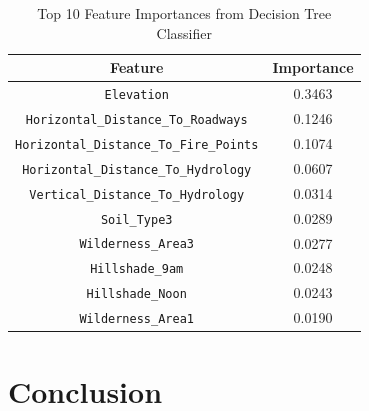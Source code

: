 \documentclass[10pt, conference]{IEEEtran}
\begin{document}
\begin{table}[!th]
	\caption{Top 10 Feature Importances from Decision Tree Classifier}
	\label{tab:feature_importance}
	\centering
	\begin{tabular}{|c|c|}
		\hline
		\textbf{Feature} & \textbf{Importance} \\
		\hline
		\texttt{Elevation} & 0.3463 \\
		\texttt{Horizontal\_Distance\_To\_Roadways} & 0.1246 \\
		\texttt{Horizontal\_Distance\_To\_Fire\_Points} & 0.1074 \\
		\texttt{Horizontal\_Distance\_To\_Hydrology} & 0.0607 \\
		\texttt{Vertical\_Distance\_To\_Hydrology} & 0.0314 \\
		\texttt{Soil\_Type3} & 0.0289 \\
		\texttt{Wilderness\_Area3} & 0.0277 \\
		\texttt{Hillshade\_9am} & 0.0248 \\
		\texttt{Hillshade\_Noon} & 0.0243 \\
		\texttt{Wilderness\_Area1} & 0.0190 \\
		\hline
	\end{tabular}
\end{table}



\section{Conclusion}



\end{document}
